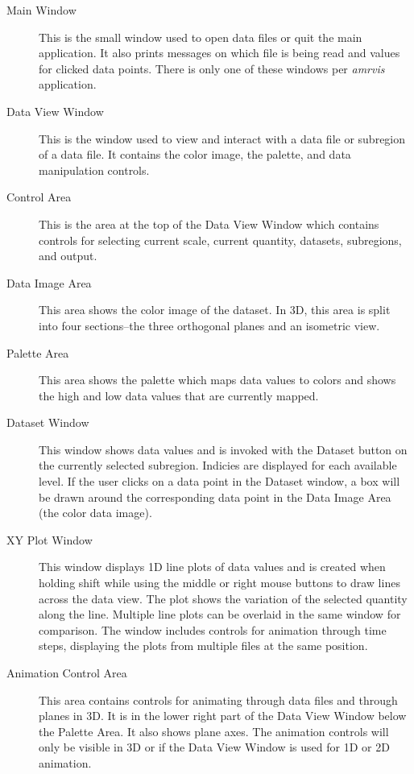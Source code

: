 \documentclass{article}
\begin{document}
\begin{description}
\item[Main Window]  This is the small window used to open data files
or quit the main application.  It also prints messages on which file
is being read and values for clicked data points.  There is only one
of these windows per {\em amrvis} application.

\item[Data View Window]  This is the window used to view and interact
with a data file or subregion of a data file.  It contains the color image,
the palette, and data manipulation controls.

\item[Control Area]  This is the area at the top of the Data View Window
which contains controls for selecting current scale, current quantity,
datasets, subregions, and output.

\item[Data Image Area]  This area shows the color image of the dataset.
In 3D, this area is split into four sections--the three orthogonal
planes and an isometric view.

\item[Palette Area]  This area shows the palette which maps data values
to colors and shows the high and low data values that are currently mapped.

\item[Dataset Window]  This window shows data values and is invoked
with the Dataset button on the currently selected subregion.
Indicies are displayed for each available level.  If the user
clicks on a data point in the Dataset window, a box will be
drawn around the corresponding data point in the Data Image Area
(the color data image).

\item[XY Plot Window]  This window displays 1D line plots of data values
and is created when holding shift while using the middle or right mouse buttons
to draw lines across the data view. The plot shows the variation of the selected
quantity along the line. Multiple line plots can be overlaid in the same
window for comparison. The window includes controls for animation through
time steps, displaying the plots from multiple files at the same position.

\item[Animation Control Area]  This area contains controls for animating
through data files and through planes in 3D.  It is in the lower right
part of the Data View Window below the Palette Area.  It also shows
plane axes.  The animation controls will only be visible in 3D or
if the Data View Window is used for 1D or 2D animation.


\end{description}
\end{document}
